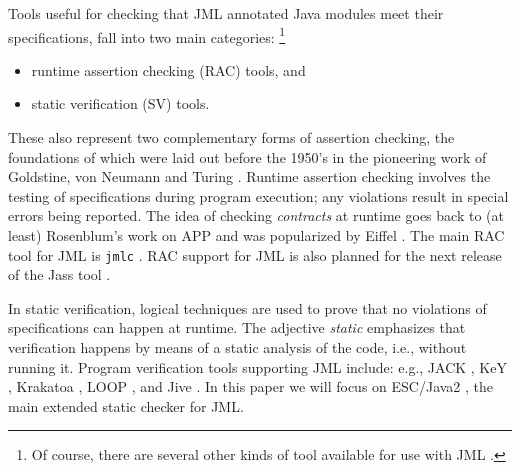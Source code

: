 \documentclass{llncs}
\begin{document}
Tools useful for checking that JML annotated Java modules meet their
specifications, fall into two main categories:%
%
\footnote{Of course, there are several other kinds of tool available for use
  with JML \cite{STTT05}.}
%
\begin{itemize}
  \item runtime assertion checking (RAC) tools, and
  \item static verification (SV) tools.
\end{itemize}
%
These also represent two complementary forms of assertion checking, the
foundations of which were laid out before the 1950's in the pioneering work
of Goldstine, von Neumann and Turing \cite{Jones03}.
%
Runtime assertion checking involves the testing of specifications during
program execution; any violations result in special errors being reported.
%
The idea of checking \emph{contracts} at runtime
goes back to (at least) Rosenblum's work on APP
\cite{Rosenblum92,Rosenblum95}
and was popularized by Eiffel \cite{Meyer97}.
The main RAC tool for JML is \texttt{jmlc} \cite{Cheon-Leavens02b}.
RAC support for JML is also planned for the next release of the Jass tool
\cite{Bartetzko-etal01}.

In static verification,
logical techniques are used to prove that no violations of
specifications can happen at runtime.
The adjective \emph{static\/} emphasizes that verification
happens by means of a static analysis of the code, i.e., without running it.
%
%
Program verification tools supporting JML include: e.g., JACK \cite{JACK}, KeY
\cite{KeY}, Krakatoa \cite{Krakatoa}, LOOP \cite{LOOP}, and Jive
\cite{Jive00}.  In this paper we will focus on ESC/Java2 \cite{Cok-Kiniry04},
the main extended static checker for JML.
\end{document}
